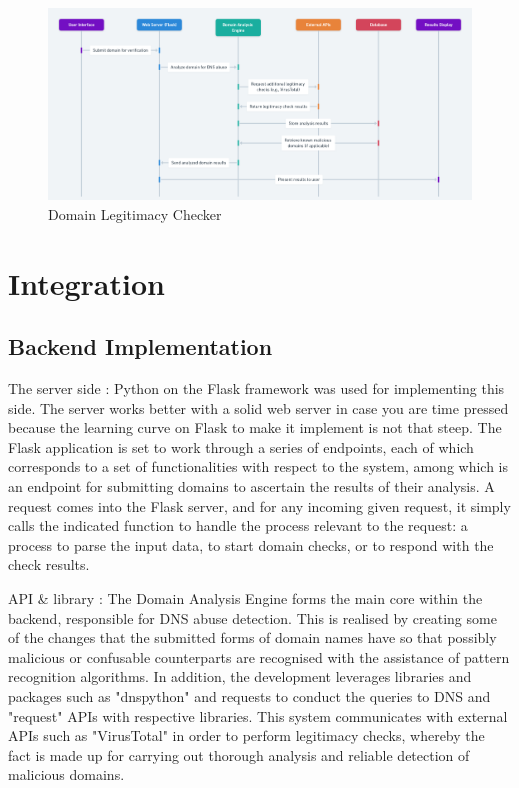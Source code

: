 \begin{figure}[H]
\captionsetup{font= footnotesize}
    \centering
    \includegraphics[width=1\linewidth]{project/DNS Abuse Transparency System.png}
    \caption{Domain Legitimacy Checker}
    \label{fig:figfig}
\end{figure}

\section{Integration} 
\subsection{Backend Implementation}

The server side :  Python on the Flask framework was used for implementing this side. The server works better with a solid web server in case you are time pressed because the learning curve on Flask to make it implement is not that steep. The Flask application is set to work through a series of endpoints, each of which corresponds to a set of functionalities with respect to the system, among which is an endpoint for submitting domains to ascertain the results of their analysis. A request comes into the Flask server, and for any incoming given request, it simply calls the indicated function to handle the process relevant to the request: a process to parse the input data, to start domain checks, or to respond with the check results.

 API \& library : The Domain Analysis Engine forms the main core within the backend, responsible for DNS abuse detection. This is realised by creating some of the changes that the submitted forms of domain names have so that possibly malicious or confusable counterparts are recognised with the assistance of pattern recognition algorithms. In addition, the development leverages libraries and packages such as "dnspython" and requests to conduct the queries to DNS and "request" APIs with respective libraries. This system communicates with external APIs such as "VirusTotal" in order to perform legitimacy checks, whereby the fact is made up for carrying out thorough analysis and reliable detection of malicious domains.

